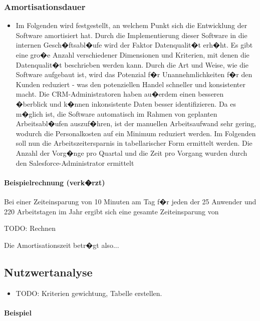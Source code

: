 \subsubsection{Amortisationsdauer}
\label{sec:Amortisationsdauer}
\begin{itemize}
	\item Im Folgenden wird festgestellt, an welchem Punkt sich die Entwicklung der Software amortisiert hat.
    Durch die Implementierung dieser Software in die internen Gesch�ftsabl�ufe wird der Faktor Datenqualit�t erh�ht. 
 	Es gibt eine gro�e Anzahl verschiedener Dimensionen und Kriterien, mit denen die Datenqualit�t beschrieben werden kann. 
	Durch die Art und Weise, wie die Software aufgebaut ist, wird das Potenzial f�r Unannehmlichkeiten f�r den Kunden reduziert - was den potenziellen Handel 	      schneller und konsistenter macht.
	Die CRM-Administratoren haben au�erdem einen besseren �berblick und k�nnen inkonsistente Daten besser identifizieren.
	Da es m�glich ist, die Software automatisch im Rahmen von geplanten Arbeitsabl�ufen auszuf�hren, ist der manuellen Arbeitsaufwand sehr gering, wodurch die Personalkosten auf ein Minimum reduziert werden.
	Im Folgenden soll nun die Arbeitszeitersparnis in tabellarischer Form ermittelt werden. Die Anzahl der Vorg�nge
	pro Quartal und die Zeit pro Vorgang wurden durch den Salesforce-Administrator ermittelt
\end{itemize}

\paragraph{Beispielrechnung (verk�rzt)}
Bei einer Zeiteinsparung von 10 Minuten am Tag f�r jeden der 25 Anwender und 220 Arbeitstagen im Jahr ergibt sich eine gesamte Zeiteinsparung von 

TODO: Rechnen

Die Amortisationszeit betr�gt also...


\subsection{Nutzwertanalyse}
\label{sec:Nutzwertanalyse}
\begin{itemize}
	\item TODO: Kriterien gewichtung, Tabelle erstellen.
\end{itemize}

\paragraph{Beispiel}


